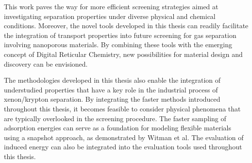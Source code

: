  
\begin{center}
\end{center}


This work paves the way for more efficient screening strategies aimed at investigating separation properties under diverse physical and chemical conditions. Moreover, the novel tools developed in this thesis can readily facilitate the integration of transport properties into future screening for gas separation involving nanoporous materials. By combining these tools with the emerging concept of Digital Reticular Chemistry,\autocite{Lyu_2020} new possibilities for material design and discovery can be envisioned.

The methodologies developed in this thesis also enable the integration of understudied properties that have a key role in the industrial process of xenon/krypton separation. By integrating the faster methods introduced throughout this thesis, it becomes feasible to consider physical phenomena that are typically overlooked in the screening procedure. The faster sampling of adsorption energies can serve as a foundation for modeling flexible materials using a snapshot approach, as demonstrated by Witman et al.\autocite{Witman_2017} The evaluation of induced energy\autocite{Lachet_1998} can also be integrated into the evaluation tools used throughout this thesis. 



\vfill
\begin{center}
\end{center}
\vfill\vfill
